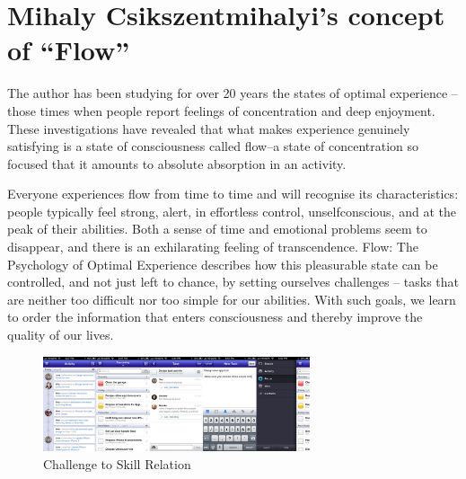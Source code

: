 \section{Mihaly Csikszentmihalyi's concept of ``Flow''}
\label{sec:flow}

The author has been studying for over 20 years the states of optimal experience -- those times when people report feelings of concentration and deep enjoyment. These investigations have revealed that what makes experience genuinely satisfying is a state of consciousness called flow--a state of concentration so focused that it amounts to absolute absorption in an activity. 

Everyone experiences flow from time to time and will recognise its characteristics: people typically feel strong, alert, in effortless control, unselfconscious, and at the peak of their abilities. Both a sense of time and emotional problems seem to disappear, and there is an exhilarating feeling of transcendence. Flow: The Psychology of Optimal Experience describes how this pleasurable state can be controlled, and not just left to chance, by setting ourselves challenges -- tasks that are neither too difficult nor too simple for our abilities. With such goals, we learn to order the information that enters consciousness and thereby improve the quality of our lives.

\begin{figure}[t]
	\centering
	\includegraphics[width=0.7\textwidth]{resources/flow.pdf}
	\caption[Challenge to Skill Relation]{Challenge to Skill Relation}
\end{figure}


